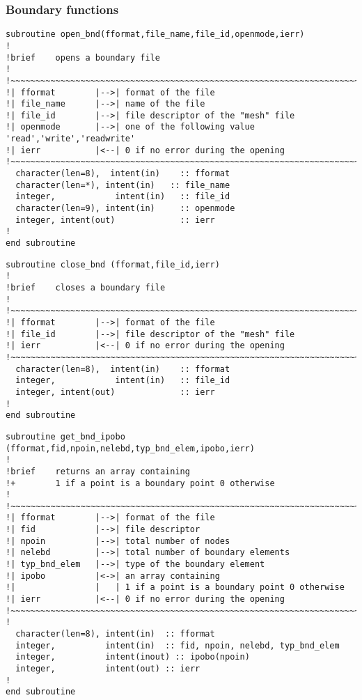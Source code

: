 \subsubsection{Boundary functions}
%
\begin{lstlisting}
subroutine open_bnd(fformat,file_name,file_id,openmode,ierr)
!
!brief    opens a boundary file
!
!~~~~~~~~~~~~~~~~~~~~~~~~~~~~~~~~~~~~~~~~~~~~~~~~~~~~~~~~~~~~~~~~~~~~~~~
!| fformat        |-->| format of the file
!| file_name      |-->| name of the file
!| file_id        |-->| file descriptor of the "mesh" file
!| openmode       |-->| one of the following value 'read','write','readwrite'
!| ierr           |<--| 0 if no error during the opening
!~~~~~~~~~~~~~~~~~~~~~~~~~~~~~~~~~~~~~~~~~~~~~~~~~~~~~~~~~~~~~~~~~~~~~~~
  character(len=8),  intent(in)    :: fformat
  character(len=*), intent(in)   :: file_name
  integer,            intent(in)   :: file_id
  character(len=9), intent(in)     :: openmode
  integer, intent(out)             :: ierr
!
end subroutine
\end{lstlisting}
%
\begin{lstlisting}
subroutine close_bnd (fformat,file_id,ierr)
!
!brief    closes a boundary file
!
!~~~~~~~~~~~~~~~~~~~~~~~~~~~~~~~~~~~~~~~~~~~~~~~~~~~~~~~~~~~~~~~~~~~~~~~
!| fformat        |-->| format of the file
!| file_id        |-->| file descriptor of the "mesh" file
!| ierr           |<--| 0 if no error during the opening
!~~~~~~~~~~~~~~~~~~~~~~~~~~~~~~~~~~~~~~~~~~~~~~~~~~~~~~~~~~~~~~~~~~~~~~~
  character(len=8),  intent(in)    :: fformat
  integer,            intent(in)   :: file_id
  integer, intent(out)             :: ierr
!
end subroutine
\end{lstlisting}
%
\begin{lstlisting}
subroutine get_bnd_ipobo (fformat,fid,npoin,nelebd,typ_bnd_elem,ipobo,ierr)
!
!brief    returns an array containing
!+        1 if a point is a boundary point 0 otherwise
!
!~~~~~~~~~~~~~~~~~~~~~~~~~~~~~~~~~~~~~~~~~~~~~~~~~~~~~~~~~~~~~~~~~~~~~~~
!| fformat        |-->| format of the file
!| fid            |-->| file descriptor
!| npoin          |-->| total number of nodes
!| nelebd         |-->| total number of boundary elements
!| typ_bnd_elem   |-->| type of the boundary element
!| ipobo          |<->| an array containing
!|                |   | 1 if a point is a boundary point 0 otherwise
!| ierr           |<--| 0 if no error during the opening
!~~~~~~~~~~~~~~~~~~~~~~~~~~~~~~~~~~~~~~~~~~~~~~~~~~~~~~~~~~~~~~~~~~~~~~~
!
  character(len=8), intent(in)  :: fformat
  integer,          intent(in)  :: fid, npoin, nelebd, typ_bnd_elem
  integer,          intent(inout) :: ipobo(npoin)
  integer,          intent(out) :: ierr
!
end subroutine
\end{lstlisting}
